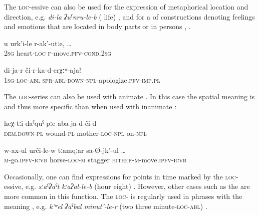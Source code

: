 The \textsc{loc}-essive can also be used for the expression of metaphorical location and direction, e.g. \textit{di-la} \textit{ʡuˁnru-le-b} ( life) , and for a  of constructions denoting feelings and emotions that are located in body parts or in persons , .
%
\begin{exe}
	\ex	\label{ex:when I remember you,}
	\gll	u	urk'i-le	r-ak'-utːe, \ldots\\
		2\textsc{sg}	heart-\textsc{loc}	\textsc{f}-move.\textsc{pfv}-\textsc{cond}.2\textsc{sg}\\
	\glt	{}

	\ex	\label{ex:forgive me}
	\gll	di-ja-r	či-r-ka-d-erχːʷ-aja! \\
		1\textsc{sg}-\textsc{loc}-\textsc{abl}	\textsc{spr}-\textsc{abl-down}-\textsc{npl}-apologize.\textsc{pfv}-\textsc{imp}.\textsc{pl}\\
	\glt	{}
\end{exe}

The \textsc{loc-}series can also be used with animate . In this case the spatial meaning is  and thus more specific than when used with inanimate :

\begin{exe}
	\ex	\label{ex:these wounds on the mother}
	\gll	heχ-tːi	daˁquˁ-pːe	aba-ja-d	či-d \\
		\textsc{dem.down}-\textsc{pl}	wound-\textsc{pl}	mother-\textsc{loc}-\textsc{npl}	on-\textsc{npl}\\
	\glt	{}

	\ex	\label{ex:(he was) riding on a horse and shaking}
	\gll	w-ax-ul	urči-le-w	tːamqːar	sa-Ø-jk'-ul	\ldots\\
		\textsc{m}-go.\textsc{ipfv}-\textsc{icvb}	horse-\textsc{loc}-\textsc{m}	stagger	\textsc{hither}-\textsc{m}-move.\textsc{ipfv}-\textsc{icvb}\\
	\glt	{}
\end{exe}

Occasionally, one can find expressions for points in time marked by the \textsc{loc}-essive, e.g. \textit{sːaˁʡaˁt} \textit{kːaʔal-le-b} (hour eight) . However, other cases such as the  are more common in this function. The \textsc{loc}- is regularly used in phrases with the meaning , e.g. \textit{k'ʷel ʡaˁbal minut'-le-r} (two three minute-\textsc{loc-abl}) .

